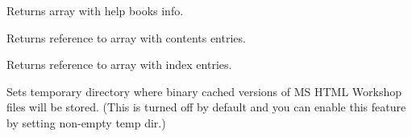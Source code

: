 
Returns array with help books info.

\label{wxhtmlhelpdatagetcontentsarray}


Returns reference to array with contents entries.

\label{wxhtmlhelpdatagetindexarray}


Returns reference to array with index entries.

\label{wxhtmlhelpdatasettempdir}


Sets temporary directory where binary cached versions of MS HTML Workshop
files will be stored. (This is turned off by default and you can enable
this feature by setting non-empty temp dir.)

